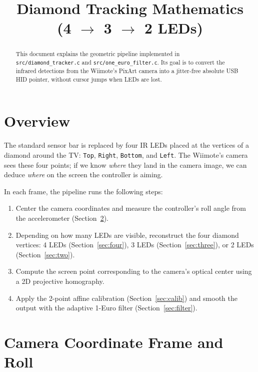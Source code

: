 \documentclass[11pt,a4paper]{article}
\title{Diamond Tracking Mathematics\\\large (4 $\to$ 3 $\to$ 2 LEDs)}
\author{\code{wiimote-pico-mouse}}
\date{}
\newcommand{\code}[1]{\texttt{#1}}
\begin{document}
\maketitle

\begin{abstract}
This document explains the geometric pipeline implemented in
\code{src/diamond\_tracker.c} and \code{src/one\_euro\_filter.c}. Its goal is
to convert the infrared detections from the Wiimote's PixArt camera into a
jitter-free absolute USB HID pointer, without cursor jumps when LEDs are lost.
\end{abstract}

\tableofcontents

\section{Overview}

The standard sensor bar is replaced by four IR LEDs placed at the vertices of a
diamond around the TV: \code{Top}, \code{Right}, \code{Bottom}, and
\code{Left}. The Wiimote's camera sees these four points; if we know
\emph{where} they land in the camera image, we can deduce \emph{where} on the
screen the controller is aiming.

In each frame, the pipeline runs the following steps:
\begin{enumerate}[nosep]
  \item Center the camera coordinates and measure the controller's roll angle
        from the accelerometer (Section~\ref{sec:camera}).
  \item Depending on how many LEDs are visible, reconstruct the four diamond
        vertices: 4 LEDs (Section~\ref{sec:four}), 3 LEDs
        (Section~\ref{sec:three}), or 2 LEDs (Section~\ref{sec:two}).
  \item Compute the screen point corresponding to the camera's optical center
        using a 2D projective homography.
  \item Apply the 2-point affine calibration (Section~\ref{sec:calib}) and
        smooth the output with the adaptive 1-Euro filter
        (Section~\ref{sec:filter}).
\end{enumerate}

\section{Camera Coordinate Frame and Roll}
\label{sec:camera}
\end{document}
